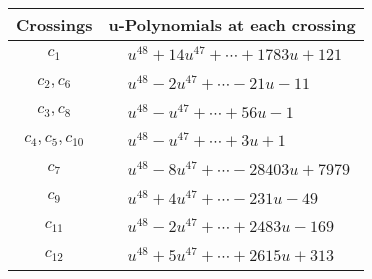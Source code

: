 \documentclass[1p]{elsarticle_modified}
\theoremstyle{definition}
\begin{document}
\begin{tabular}{m{50pt}|m{274pt}}
Crossings & \hspace{64pt}u-Polynomials at each crossing \\
\hline $$\begin{aligned}c_{1}\end{aligned}$$&$\begin{aligned}
&u^{48}+14 u^{47}+\cdots+1783 u+121
\end{aligned}$\\
\hline $$\begin{aligned}c_{2},c_{6}\end{aligned}$$&$\begin{aligned}
&u^{48}-2 u^{47}+\cdots-21 u-11
\end{aligned}$\\
\hline $$\begin{aligned}c_{3},c_{8}\end{aligned}$$&$\begin{aligned}
&u^{48}- u^{47}+\cdots+56 u-1
\end{aligned}$\\
\hline $$\begin{aligned}c_{4},c_{5},c_{10}\end{aligned}$$&$\begin{aligned}
&u^{48}- u^{47}+\cdots+3 u+1
\end{aligned}$\\
\hline $$\begin{aligned}c_{7}\end{aligned}$$&$\begin{aligned}
&u^{48}-8 u^{47}+\cdots-28403 u+7979
\end{aligned}$\\
\hline $$\begin{aligned}c_{9}\end{aligned}$$&$\begin{aligned}
&u^{48}+4 u^{47}+\cdots-231 u-49
\end{aligned}$\\
\hline $$\begin{aligned}c_{11}\end{aligned}$$&$\begin{aligned}
&u^{48}-2 u^{47}+\cdots+2483 u-169
\end{aligned}$\\
\hline $$\begin{aligned}c_{12}\end{aligned}$$&$\begin{aligned}
&u^{48}+5 u^{47}+\cdots+2615 u+313
\end{aligned}$\\
\hline
\end{tabular}\\~\\
\end{document}
